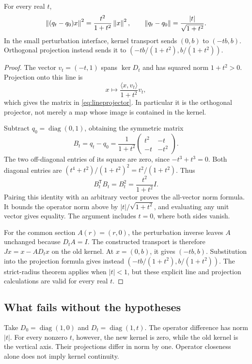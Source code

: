 \begin{proposition}\label{KS51}
For every real \(t\),
\[
 \left\lVert(q_t-q_0)x\right\rVert^2=\frac{t^2}{1+t^2}\left\lVert x\right\rVert^2,
 \qquad \left\lVert q_t-q_0\right\rVert=\frac{|t|}{\sqrt{1+t^2}}.
\]
In the small perturbation interface, kernel transport sends \((0,b)\) to \((-tb,b)\). Orthogonal projection instead sends it to \((-tb/(1+t^2),b/(1+t^2))\).
\end{proposition}
\begin{proof}
The vector \(v_t=(-t,1)\) spans \(\ker D_t\) and has squared norm \(1+t^2>0\). Projection onto this line is
\[
 x\longmapsto\frac{\langle x,v_t\rangle}{1+t^2}v_t,
\]
which gives the matrix in \eqref{eq:lineprojector}. In particular it is the orthogonal projector, not merely a map whose image is contained in the kernel.

Subtract \(q_0=\operatorname{diag}(0,1)\), obtaining the symmetric matrix
\[
 B_t=q_t-q_0=\frac1{1+t^2}
 \begin{pmatrix}t^2&-t\\-t&-t^2\end{pmatrix}.
\]
The two off-diagonal entries of its square are zero, since \(-t^3+t^3=0\). Both diagonal entries are \((t^4+t^2)/(1+t^2)^2=t^2/(1+t^2)\). Thus
\[
 B_t^{\mathsf T}B_t=B_t^2=\frac{t^2}{1+t^2}I.
\]
Pairing this identity with an arbitrary vector proves the all-vector norm formula. It bounds the operator norm above by \(|t|/\sqrt{1+t^2}\), and evaluating any unit vector gives equality. The argument includes \(t=0\), where both sides vanish.

For the common section \(A(r)=(r,0)\), the perturbation inverse leaves \(A\) unchanged because \(D_tA=I\). The constructed transport is therefore \(Jx=x-AD_tx\) on the old kernel. At \(x=(0,b)\), it gives \((-tb,b)\). Substitution into the projection formula gives instead \((-tb/(1+t^2),b/(1+t^2))\). The strict-radius theorem applies when \(|t|<1\), but these explicit line and projection calculations are valid for every real \(t\).
\end{proof}


\subsection{What fails without the hypotheses}
Take \(D_0=\operatorname{diag}(1,0)\) and \(D_t=\operatorname{diag}(1,t)\). The operator difference has norm \(|t|\). For every nonzero \(t\), however, the new kernel is zero, while the old kernel is the vertical axis. Their projections differ in norm by one. Operator closeness alone does not imply kernel continuity.

